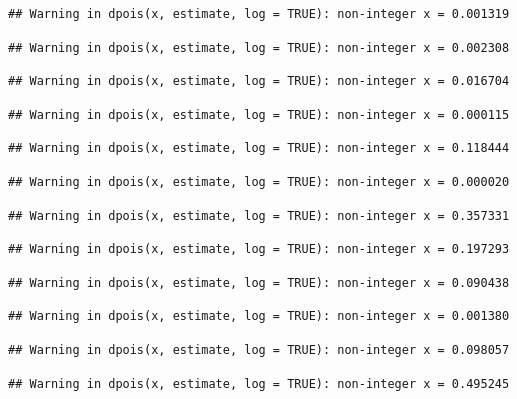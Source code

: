 \documentclass[]{article}
\begin{document}
\begin{verbatim}
## Warning in dpois(x, estimate, log = TRUE): non-integer x = 0.001319
\end{verbatim}

\begin{verbatim}
## Warning in dpois(x, estimate, log = TRUE): non-integer x = 0.002308
\end{verbatim}

\begin{verbatim}
## Warning in dpois(x, estimate, log = TRUE): non-integer x = 0.016704
\end{verbatim}

\begin{verbatim}
## Warning in dpois(x, estimate, log = TRUE): non-integer x = 0.000115
\end{verbatim}

\begin{verbatim}
## Warning in dpois(x, estimate, log = TRUE): non-integer x = 0.118444
\end{verbatim}

\begin{verbatim}
## Warning in dpois(x, estimate, log = TRUE): non-integer x = 0.000020
\end{verbatim}

\begin{verbatim}
## Warning in dpois(x, estimate, log = TRUE): non-integer x = 0.357331
\end{verbatim}

\begin{verbatim}
## Warning in dpois(x, estimate, log = TRUE): non-integer x = 0.197293
\end{verbatim}

\begin{verbatim}
## Warning in dpois(x, estimate, log = TRUE): non-integer x = 0.090438
\end{verbatim}

\begin{verbatim}
## Warning in dpois(x, estimate, log = TRUE): non-integer x = 0.001380
\end{verbatim}

\begin{verbatim}
## Warning in dpois(x, estimate, log = TRUE): non-integer x = 0.098057
\end{verbatim}

\begin{verbatim}
## Warning in dpois(x, estimate, log = TRUE): non-integer x = 0.495245
\end{verbatim}
\end{document}
